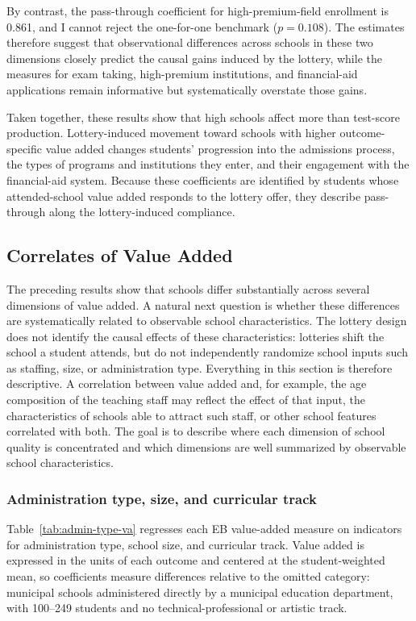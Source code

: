 \documentclass[a4paper, article, english, oneside, unknownkeysallowed, 12pt]{memoir}
\begin{document}
By contrast, the pass-through coefficient for high-premium-field enrollment is 0.861, and I cannot reject the one-for-one benchmark ($p=0.108$).
The estimates therefore suggest that observational differences across schools in these two dimensions closely predict the causal gains induced by the lottery, while the measures for exam taking, high-premium institutions, and financial-aid applications remain informative but systematically overstate those gains.

Taken together, these results show that high schools affect more than test-score production.
Lottery-induced movement toward schools with higher outcome-specific value added changes students' progression into the admissions process, the types of programs and institutions they enter, and their engagement with the financial-aid system.
Because these coefficients are identified by students whose attended-school value added responds to the lottery offer, they describe pass-through along the lottery-induced compliance.


\subsection{Correlates of Value Added}

The preceding results show that schools differ substantially across several dimensions of value added. 
A natural next question is whether these differences are systematically related to observable school characteristics. The lottery design does not identify the causal effects of these characteristics: 
lotteries shift the school a student attends, but do not independently randomize school inputs such as staffing, size, or administration type. 
Everything in this section is therefore descriptive. 
A correlation between value added and, for example, the age composition of the teaching staff may reflect the effect of that input, the characteristics of schools able to attract such staff, or other school features correlated with both. 
The goal is to describe where each dimension of school quality is concentrated and which dimensions are well summarized by observable school characteristics.

\subsubsection{Administration type, size, and curricular track}

Table~\ref{tab:admin-type-va} regresses each EB value-added measure on indicators for administration type, school size, and curricular track. 
Value added is expressed in the units of each outcome and centered at the student-weighted mean, so coefficients measure differences relative to the omitted category: 
municipal schools administered directly by a municipal education department, with 100--249 students and no technical-professional or artistic track.
\end{document}
